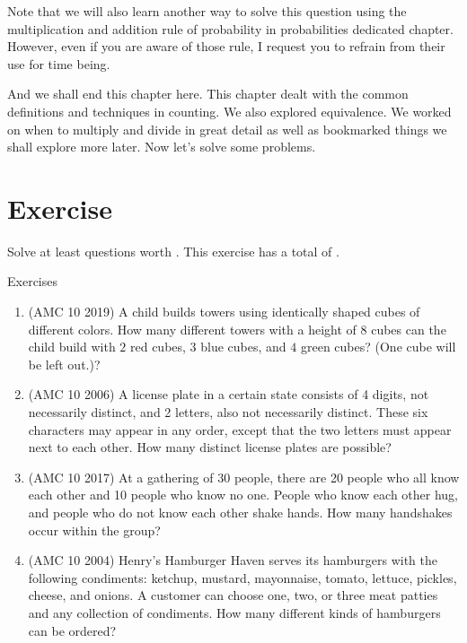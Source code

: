 Note that we will also learn another way to solve this question using the multiplication and addition rule of probability in probabilities dedicated chapter. However, even if you are aware of those rule, I request you to refrain from their use for time being.\par
And we shall end this chapter here. This chapter dealt with the common definitions and techniques 
in counting. We also explored equivalence. We worked on when to multiply and divide in great 
detail as well as bookmarked things we shall explore more later. Now let's solve some problems.
\section{Exercise}
Solve at least questions worth . This exercise has a total of .
\begin{xcb}{Exercises}
\begin{enumerate}
\item(AMC 10 2019)  A child builds towers using identically shaped cubes of different colors. 
How many different towers with a height of $8$ cubes can the child build with $2$ red cubes, $3$ blue cubes, 
and $4$ green cubes? (One cube will be left out.)?
\begin{hint}
\end{hint}
\item (AMC 10 2006)  A license plate in a certain state consists of 4 digits, not necessarily distinct, and 2 letters, also not necessarily distinct. These six characters may appear in any order, except that the two letters must appear next to each other. How many distinct license plates are possible?
\begin{hint}
\end{hint}
\item (AMC 10 2017)  At a gathering of 30 people, there are 20 people who all know each other and 10 people who know no one. People who know each other hug, and people who do not know each other shake hands. How many handshakes occur within the group?
\item (AMC 10 2004)  Henry’s Hamburger Haven serves its hamburgers with the following condiments: ketchup, mustard, mayonnaise, tomato, lettuce, pickles, cheese, and onions. A customer can choose one, two, or three meat patties and any collection of condiments. How many different kinds of hamburgers can be ordered?

\end{enumerate}
\end{xcb}
